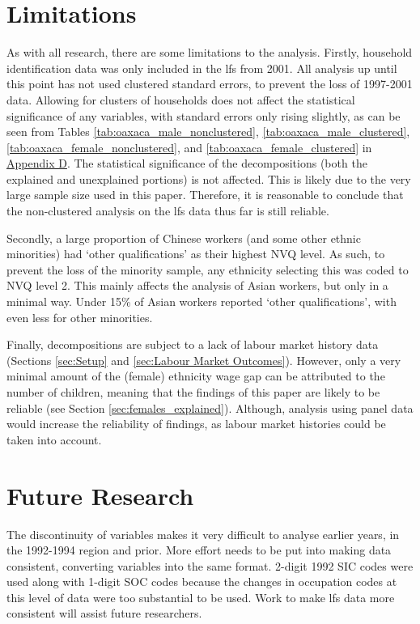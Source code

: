 \documentclass[class=article, crop=false]{standalone}
\begin{document}
\vspace{-25pt}
\section{Limitations}
\label{sec:limitations}
As with all research, there are some limitations to the analysis. Firstly, household identification data was only included in the \acrlong{lfs} from 2001. All analysis up until this point has not used clustered standard errors, to prevent the loss of 1997-2001 data. Allowing for clusters of households does not affect the statistical significance of any variables, with standard errors only rising slightly, as can be seen from Tables \ref{tab:oaxaca_male_nonclustered}, \ref{tab:oaxaca_male_clustered},  \ref{tab:oaxaca_female_nonclustered}, and \ref{tab:oaxaca_female_clustered} in \hyperref[sec:appendixD]{Appendix D}. The statistical significance of the decompositions (both the explained and unexplained portions) is not affected. This is likely due to the very large sample size used in this paper. Therefore, it is reasonable to conclude that the non-clustered analysis on the \acrshort{lfs} data thus far is still reliable.

Secondly, a large proportion of Chinese workers (and some other ethnic minorities) had \enquote*{other qualifications} as their highest NVQ level. As such, to prevent the loss of the minority sample, any ethnicity selecting this was coded to NVQ level 2. This mainly affects the analysis of Asian workers, but only in a minimal way. Under 15\% of Asian workers reported \enquote*{other qualifications}, with even less for other minorities.

Finally, decompositions are subject to a lack of labour market history data (Sections \ref{sec:Setup} and \ref{sec:Labour Market Outcomes}). However, only a very minimal amount of the (female) ethnicity wage gap can be attributed to the number of children, meaning that the findings of this paper are likely to be reliable (see Section \ref{sec:females_explained}). Although, analysis using panel data would increase the reliability of findings, as labour market histories could be taken into account.

\section{Future Research}
\label{sec:Future Research}
The discontinuity of variables makes it very difficult to analyse earlier years, in the 1992-1994 region and prior. More effort needs to be put into making data consistent, converting variables into the same format. 2-digit 1992 SIC codes were used along with 1-digit SOC codes because the changes in occupation codes at this level of data were too substantial to be used. Work to make \acrshort{lfs} data more consistent will assist future researchers.
\end{document}
